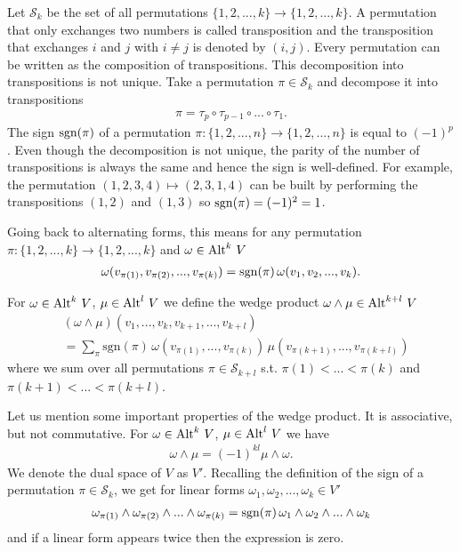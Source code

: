 \documentclass[../master_thesis.tex]{subfiles}
\begin{document}
Let $\mathcal{S}_k$ be the set of all permutations 
$\{ 1, 2, ..., k\} \rightarrow \{ 1, 2, ..., k \}$. A 
permutation that only exchanges two numbers is called transposition 
and the transposition that exchanges $i$ and $j$ with 
$i \neq j$ is denoted by $(i,j)$. Every permutation can be written as the composition of 
transpositions. This decomposition into transpositions is not unique.
Take a permutation $\pi \in \mathcal{S}_k$ and decompose it into transpositions
\begin{align*}
    \pi = \tau_p \circ \tau_{p-1} \circ ... \circ \tau_1.
\end{align*}
The sign $\operatorname{sgn}(\pi)$ of a permutation 
$\pi: \{ 1,2,...,n\} \rightarrow \{ 1,2, ..., n\}$ is equal to $(-1)^p$.
Even though the decomposition is not unique, the parity of the number of
transpositions is always the same and hence the sign is well-defined.
For example, the permutation $(1,2,3,4) \mapsto (2,3,1,4)$ 
can be built by performing the transpositions $(1,2)$ and $(1,3)$ so 
$\operatorname{sgn}(\pi) = (-1)^2 = 1$. 

Going back to alternating forms, this means for any permutation 
$\pi: \{1,2,...,k\} \rightarrow \{1,2,...,k\}$ and 
$\omega \in {\operatorname{Alt}^{k}\,V}$
\begin{align*}
    \omega(v_{\pi(1)},v_{\pi(2)},...,v_{\pi(k)})
    = \operatorname{sgn}(\pi)\, \omega(v_1, v_2,..., v_k).
\end{align*}

\begin{definition}
    For $\omega \in 
    {\operatorname{Alt}^{k}\,V}$, $\mu \in 
    {\operatorname{Alt}^{l}\,V}$ we define the wedge product $\omega \wedge \mu \in 
    {\operatorname{Alt}^{k+l}\,V}$ 
    \begin{align*}
        &(\omega \wedge \mu) (v_1,...,v_k,v_{k+1},...,v_{k+l}) 
        \\ &= \sum\limits_\pi
        \text{sgn}(\pi)\, \omega(v_{\pi(1)},...,v_{\pi(k)}) \,
        \mu(v_{\pi(k+1)},...,v_{\pi(k+l)})
    \end{align*}
    where we sum over all permutations 
    $\pi \in \mathcal{S}_{k+l}$ 
    s.t. $\pi(1) < ... < \pi(k)$ and $\pi(k+1) < ... < \pi(k+l)$.        
\end{definition}

Let us mention some important properties of the wedge product. It is 
associative, but not commutative. For $\omega \in 
{\operatorname{Alt}^{k}\,V}$, $\mu \in 
{\operatorname{Alt}^{l}\,V}$ we have 
\begin{align}
    \omega \wedge \mu = (-1)^{kl} \mu \wedge \omega. \label{eq:commutativity_wedge_product}
\end{align}
We denote the dual space of $V$ as $V'$.
Recalling the definition of the sign of a permutation $\pi \in \mathcal{S}_k$, 
we get for linear forms $\omega_1, \omega_2, ..., \omega_k \in V'$
\begin{align*}
    \omega_{\pi(1)} \wedge \omega_{\pi(2)} \wedge ... \wedge \omega_{\pi(k)}
    = \operatorname{sgn}(\pi) \, \omega_1 \wedge \omega_2 \wedge ... \wedge \omega_k
\end{align*}
and if a linear form appears twice then the expression is zero.
\end{document}

